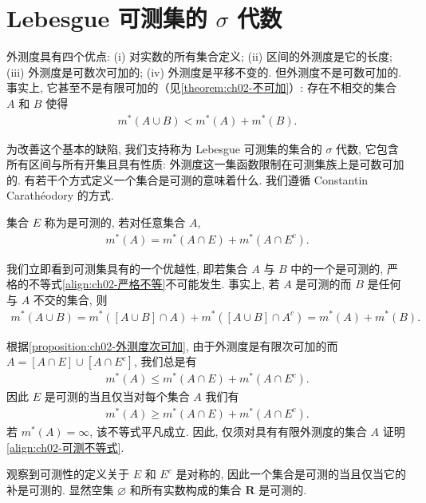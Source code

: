 \documentclass[../../main.tex]{subfiles}
\begin{document}
\section{Lebesgue 可测集的 $\sigma$ 代数}\label{section:ch02-可测集}

外测度具有四个优点: (i) 对实数的所有集合定义; (ii) 区间的外测度是它的长度; (iii) 外测度是可数次可加的; (iv) 外测度是平移不变的. 但外测度不是可数可加的. 事实上, 它甚至不是有限可加的（见\cref{theorem:ch02-不可加}）: 存在不相交的集合 $A$ 和 $B$ 使得
\begin{align}
m^{*}(A\cup B)<m^{*}(A)+m^{*}(B).\label{align:ch02-严格不等}
\end{align}

为改善这个基本的缺陷, 我们支持称为 Lebesgue 可测集的集合的 $\sigma$ 代数, 它包含所有区间与所有开集且具有性质: 外测度这一集函数限制在可测集族上是可数可加的. 有若干个方式定义一个集合是可测的意味着什么. 我们遵循 Constantin Carath\'eodory 的方式.

\begin{definition}\label{definition:ch02-Caratheodory}
集合 $E$ 称为是可测的, 若对任意集合 $A$,
\begin{align*}
m^{*}(A)=m^{*}(A\cap E)+m^{*}(A\cap E^{c}).
\end{align*}
\end{definition}

我们立即看到可测集具有的一个优越性, 即若集合 $A$ 与 $B$ 中的一个是可测的, 严格的不等式\eqref{align:ch02-严格不等}不可能发生. 事实上, 若 $A$ 是可测的而 $B$ 是任何与 $A$ 不交的集合, 则
\begin{align*}
m^{*}(A\cup B)=m^{*}([A\cup B]\cap A)+m^{*}([A\cup B]\cap A^{c})=m^{*}(A)+m^{*}(B).
\end{align*}

根据\cref{proposition:ch02-外测度次可加}, 由于外测度是有限次可加的而 $A=[A\cap E]\cup[A\cap E^{c}]$, 我们总是有
\begin{align*}
m^{*}(A)\leqslant m^{*}(A\cap E)+m^{*}(A\cap E^{c}).
\end{align*}
因此 $E$ 是可测的当且仅当对每个集合 $A$ 我们有
\begin{align}
m^{*}(A)\geqslant m^{*}(A\cap E)+m^{*}(A\cap E^{c}).\label{align:ch02-可测不等式}
\end{align}
若 $m^{*}(A)=\infty$, 该不等式平凡成立. 因此, 仅须对具有有限外测度的集合 $A$ 证明\eqref{align:ch02-可测不等式}.

观察到可测性的定义关于 $E$ 和 $E^{c}$ 是对称的, 因此一个集合是可测的当且仅当它的补是可测的. 显然空集 $\varnothing$ 和所有实数构成的集合 $\mathbf{R}$ 是可测的.
\end{document}
